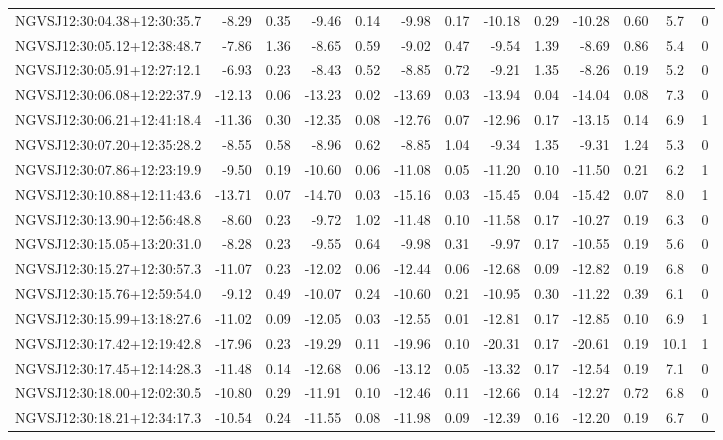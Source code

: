 \begin{tabular}{lrrrrrrrrrrcc}
NGVSJ12:30:04.38+12:30:35.7 & -8.29 & 0.35 & -9.46 & 0.14 & -9.98 & 0.17 & -10.18 & 0.29 & -10.28 & 0.60 & 5.7 & 0 \\
NGVSJ12:30:05.12+12:38:48.7 & -7.86 & 1.36 & -8.65 & 0.59 & -9.02 & 0.47 & -9.54 & 1.39 & -8.69 & 0.86 & 5.4 & 0 \\
NGVSJ12:30:05.91+12:27:12.1 & -6.93 & 0.23 & -8.43 & 0.52 & -8.85 & 0.72 & -9.21 & 1.35 & -8.26 & 0.19 & 5.2 & 0 \\
NGVSJ12:30:06.08+12:22:37.9 & -12.13 & 0.06 & -13.23 & 0.02 & -13.69 & 0.03 & -13.94 & 0.04 & -14.04 & 0.08 & 7.3 & 0 \\
NGVSJ12:30:06.21+12:41:18.4 & -11.36 & 0.30 & -12.35 & 0.08 & -12.76 & 0.07 & -12.96 & 0.17 & -13.15 & 0.14 & 6.9 & 1 \\
NGVSJ12:30:07.20+12:35:28.2 & -8.55 & 0.58 & -8.96 & 0.62 & -8.85 & 1.04 & -9.34 & 1.35 & -9.31 & 1.24 & 5.3 & 0 \\
NGVSJ12:30:07.86+12:23:19.9 & -9.50 & 0.19 & -10.60 & 0.06 & -11.08 & 0.05 & -11.20 & 0.10 & -11.50 & 0.21 & 6.2 & 1 \\
NGVSJ12:30:10.88+12:11:43.6 & -13.71 & 0.07 & -14.70 & 0.03 & -15.16 & 0.03 & -15.45 & 0.04 & -15.42 & 0.07 & 8.0 & 1 \\
NGVSJ12:30:13.90+12:56:48.8 & -8.60 & 0.23 & -9.72 & 1.02 & -11.48 & 0.10 & -11.58 & 0.17 & -10.27 & 0.19 & 6.3 & 0 \\
NGVSJ12:30:15.05+13:20:31.0 & -8.28 & 0.23 & -9.55 & 0.64 & -9.98 & 0.31 & -9.97 & 0.17 & -10.55 & 0.19 & 5.6 & 0 \\
NGVSJ12:30:15.27+12:30:57.3 & -11.07 & 0.23 & -12.02 & 0.06 & -12.44 & 0.06 & -12.68 & 0.09 & -12.82 & 0.19 & 6.8 & 0 \\
NGVSJ12:30:15.76+12:59:54.0 & -9.12 & 0.49 & -10.07 & 0.24 & -10.60 & 0.21 & -10.95 & 0.30 & -11.22 & 0.39 & 6.1 & 0 \\
NGVSJ12:30:15.99+13:18:27.6 & -11.02 & 0.09 & -12.05 & 0.03 & -12.55 & 0.01 & -12.81 & 0.17 & -12.85 & 0.10 & 6.9 & 1 \\
NGVSJ12:30:17.42+12:19:42.8 & -17.96 & 0.23 & -19.29 & 0.11 & -19.96 & 0.10 & -20.31 & 0.17 & -20.61 & 0.19 & 10.1 & 1 \\
NGVSJ12:30:17.45+12:14:28.3 & -11.48 & 0.14 & -12.68 & 0.06 & -13.12 & 0.05 & -13.32 & 0.17 & -12.54 & 0.19 & 7.1 & 0 \\
NGVSJ12:30:18.00+12:02:30.5 & -10.80 & 0.29 & -11.91 & 0.10 & -12.46 & 0.11 & -12.66 & 0.14 & -12.27 & 0.72 & 6.8 & 0 \\
NGVSJ12:30:18.21+12:34:17.3 & -10.54 & 0.24 & -11.55 & 0.08 & -11.98 & 0.09 & -12.39 & 0.16 & -12.20 & 0.19 & 6.7 & 0 \\

\end{tabular}
